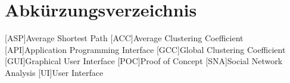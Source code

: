 \chapter*{Abkürzungsverzeichnis}

\begin{acronym}[nonumberlist]
    [ASP]{Average Shortest Path}
    [ACC]{Average Clustering Coefficient}
    [API]{Application Programming Interface}
    [GCC]{Global Clustering Coefficient}
    [GUI]{Graphical User Interface}
    [POC]{Proof of Concept}
    [SNA]{Social Network Analysis}
    [UI]{User Interface}
\end{acronym}
